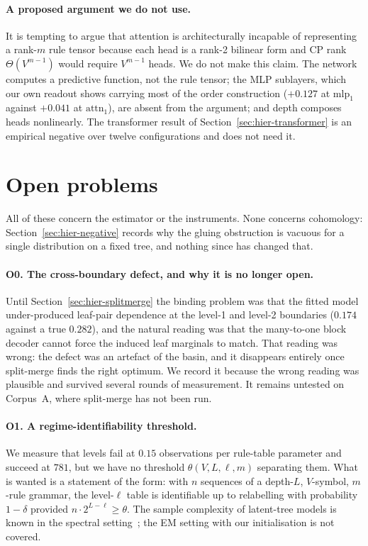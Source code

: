 \documentclass[11pt,a4paper]{article}
\theoremstyle{plain}
\theoremstyle{definition}
\begin{document}
\paragraph{A proposed argument we do not use.}
It is tempting to argue that attention is architecturally incapable of
representing a rank-$m$ rule tensor because each head is a rank-2 bilinear form
and CP rank $\Theta(V^{m-1})$ would require $V^{m-1}$ heads. We do not make
this claim. The network computes a predictive function, not the rule tensor;
the MLP sublayers, which our own readout shows carrying most of the order
construction ($+0.127$ at $\mathrm{mlp}_1$ against $+0.041$ at
$\mathrm{attn}_1$), are absent from the argument; and depth composes heads
nonlinearly. The transformer result of Section~\ref{sec:hier-transformer} is an
empirical negative over twelve configurations and does not need it.



\section{Open problems}
\label{sec:hier-open}

All of these concern the estimator or the instruments. None concerns
cohomology: Section~\ref{sec:hier-negative} records why the gluing obstruction
is vacuous for a single distribution on a fixed tree, and nothing since has
changed that.

\paragraph{O0. The cross-boundary defect, and why it is no longer open.}
Until Section~\ref{sec:hier-splitmerge} the binding problem was that the fitted
model under-produced leaf-pair dependence at the level-1 and level-2
boundaries ($0.174$ against a true $0.282$), and the natural reading was that
the many-to-one block decoder cannot force the induced leaf marginals to match.
That reading was wrong: the defect was an artefact of the basin, and it
disappears entirely once split-merge finds the right optimum. We record it
because the wrong reading was plausible and survived several rounds of
measurement. It remains untested on Corpus~A, where split-merge has not been
run.

\paragraph{O1. A regime-identifiability threshold.}
We measure that levels fail at $0.15$ observations per rule-table parameter and
succeed at $781$, but we have no threshold $\theta(V, L, \ell, m)$ separating
them. What is wanted is a statement of the form: with $n$ sequences of a
depth-$L$, $V$-symbol, $m$-rule grammar, the level-$\ell$ table is identifiable
up to relabelling with probability $1-\delta$ provided
$n \cdot 2^{L-\ell} \ge \theta$. The sample complexity of latent-tree models is
known in the spectral setting~\cite{choi2011}; the EM setting with our
initialisation is not covered.
\end{document}
